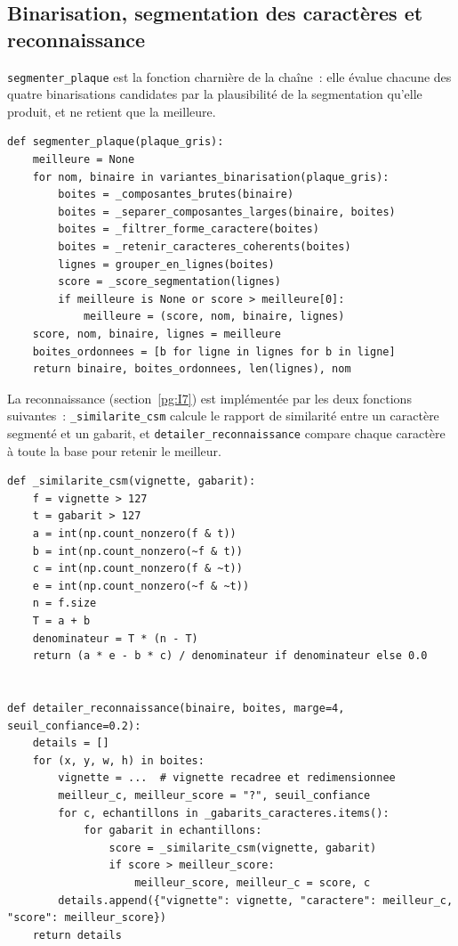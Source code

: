 \documentclass[11pt,a4paper]{article}
\begin{document}
\subsection{Binarisation, segmentation des caractères et reconnaissance}
\label{pg:III2}

\texttt{segmenter\_plaque} est la fonction charnière de la chaîne~: elle évalue chacune des quatre binarisations candidates par la plausibilité de la segmentation qu'elle produit, et ne retient que la meilleure.

\begin{lstlisting}
def segmenter_plaque(plaque_gris):
    meilleure = None
    for nom, binaire in variantes_binarisation(plaque_gris):
        boites = _composantes_brutes(binaire)
        boites = _separer_composantes_larges(binaire, boites)
        boites = _filtrer_forme_caractere(boites)
        boites = _retenir_caracteres_coherents(boites)
        lignes = grouper_en_lignes(boites)
        score = _score_segmentation(lignes)
        if meilleure is None or score > meilleure[0]:
            meilleure = (score, nom, binaire, lignes)
    score, nom, binaire, lignes = meilleure
    boites_ordonnees = [b for ligne in lignes for b in ligne]
    return binaire, boites_ordonnees, len(lignes), nom
\end{lstlisting}

La reconnaissance (section~\ref{pg:I7}) est implémentée par les deux fonctions suivantes~: \texttt{\_similarite\_csm} calcule le rapport de similarité entre un caractère segmenté et un gabarit, et \texttt{detailer\_reconnaissance} compare chaque caractère à toute la base pour retenir le meilleur.

\begin{lstlisting}
def _similarite_csm(vignette, gabarit):
    f = vignette > 127
    t = gabarit > 127
    a = int(np.count_nonzero(f & t))
    b = int(np.count_nonzero(~f & t))
    c = int(np.count_nonzero(f & ~t))
    e = int(np.count_nonzero(~f & ~t))
    n = f.size
    T = a + b
    denominateur = T * (n - T)
    return (a * e - b * c) / denominateur if denominateur else 0.0


def detailer_reconnaissance(binaire, boites, marge=4, seuil_confiance=0.2):
    details = []
    for (x, y, w, h) in boites:
        vignette = ...  # vignette recadree et redimensionnee
        meilleur_c, meilleur_score = "?", seuil_confiance
        for c, echantillons in _gabarits_caracteres.items():
            for gabarit in echantillons:
                score = _similarite_csm(vignette, gabarit)
                if score > meilleur_score:
                    meilleur_score, meilleur_c = score, c
        details.append({"vignette": vignette, "caractere": meilleur_c, "score": meilleur_score})
    return details
\end{lstlisting}
\end{document}
